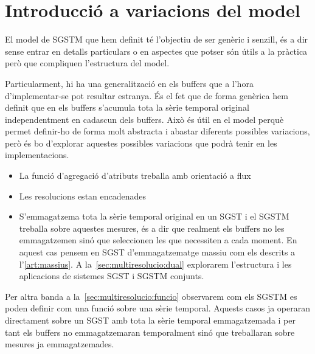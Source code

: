 \chapter{Introducció a variacions del model}




El model de \gls{SGSTM} que hem definit té l'objectiu de ser genèric i senzill, és a dir sense entrar en detalls particulars o en aspectes que potser són útils a la pràctica però que compliquen l'estructura del model.


Particularment, hi ha una generalització en els buffers que a l'hora d'implementar-se pot resultar estranya. És el fet que de forma genèrica hem definit que en els buffers s'acumula tota la sèrie temporal original independentment en cadascun dels buffers. Això és útil en el model perquè permet definir-ho de forma molt abstracta i abastar diferents possibles variacions, però és bo d'explorar aquestes possibles variacions que podrà tenir en les implementacions.

\begin{itemize}
\item La funció d'agregació d'atributs treballa amb orientació a flux

\item Les resolucions estan encadenades

\item S'emmagatzema tota la sèrie temporal original en un \gls{SGST} i el
\gls{SGSTM} treballa sobre aquestes mesures, és a dir que realment els
buffers no les emmagatzemen sinó que seleccionen les que necessiten a
cada moment. En aquest cas pensem en \gls{SGST} d'emmagatzematge
massiu com els descrits a l'\autoref{art:massius}. A
la~\autoref{sec:multiresolucio:dual} explorarem l'estructura i les
aplicacions de sistemes \gls{SGST} i \gls{SGSTM} conjunts.

\end{itemize}

Per altra banda a la~\autoref{sec:multiresolucio:funcio} observarem com els \gls{SGSTM} es poden definir com una funció sobre una sèrie temporal. Aquests casos ja operaran directament sobre un \gls{SGST} amb tota la sèrie temporal emmagatzemada i per tant els buffers no emmagatzemaran temporalment sinó que treballaran sobre mesures ja emmagatzemades. 











